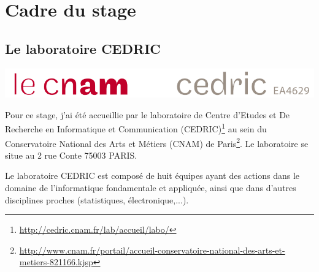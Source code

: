 \documentclass{article}
\begin{document}
\section{Cadre du stage}
	\subsection{Le laboratoire CEDRIC}
		\begin{center}
			\includegraphics[scale=0.45]{../include/logo-cedric.PNG}\\
		\end{center}
		\hspace*{0.4cm}
		Pour ce stage, j'ai été accueillie par le laboratoire de Centre d'Etudes et De Recherche en Informatique et Communication (CEDRIC)\footnote{\href{http://cedric.cnam.fr/lab/accueil/labo/}{http://cedric.cnam.fr/lab/accueil/labo/}} au sein du Conservatoire National des Arts et Métiers (CNAM) de Paris\footnote{\href{http://www.cnam.fr/portail/accueil-conservatoire-national-des-arts-et-metiers-821166.kjsp}{http://www.cnam.fr/portail/accueil-conservatoire-national-des-arts-et-metiers-821166.kjsp}}. 
		Le laboratoire se situe au 2 rue Conte 75003 PARIS.\par
		Le laboratoire CEDRIC est composé de huit équipes ayant des actions dans le domaine de l'informatique fondamentale et appliquée, ainsi que dans d'autres disciplines proches (statistiques, électronique,...).
\end{document}
